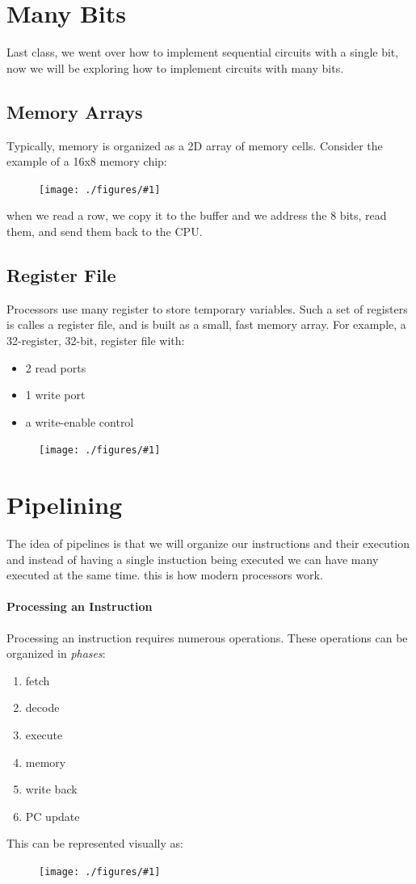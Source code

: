 \documentclass[12pt]{book}
\title{\coursetitle\linebreak\lecturename}
\author{\\Cain Susko\\ 
           \\ \\ \\
      Queen's University 
    \\School of Computing\\}
\newcommand{\incimg}[2]{%
       \begin{figure}[h]
               \centering
               \texttt{[image: ./figures/\#1]}
       \end{figure}
}
\begin{document}
\begin{titlepage}
        \maketitle
\end{titlepage}


\section*{Many Bits}
Last class, we went over how to implement sequential circuits with a single bit,
now we will be exploring how to implement circuits with many bits.

\subsection*{Memory Arrays}
Typically, memory is organized as a 2D array of memory cells. 
Consider the example of a 16x8 memory chip:
\incimg{memArr}{0.5}

when we read a row, we copy it to the buffer and we address the 8 bits, read them, and send them 
back to the CPU.

\subsection*{Register File}
Processors use many register to store temporary variables. Such a set of registers is calles a 
register file, and is built as a small, fast memory array. For example, a 32-register, 32-bit, 
register file with:
\begin{itemize}
        \item 2 read ports
        \item 1 write port
        \item a write-enable control
\end{itemize}
\incimg{regFile}{0.5}

\section*{Pipelining}
The idea of pipelines is that we will organize our instructions and their execution and instead 
of having a single instuction being executed we can have many executed at the same time. this is
how modern processors work.

\paragraph{Processing an Instruction}
Processing an instruction requires numerous operations. These operations can be organized in 
\textit{phases}:
\begin{enumerate}
        \item fetch
        \item decode
        \item execute
        \item memory
        \item write back
        \item PC update
\end{enumerate}
 This can be represented visually as:
 \incimg{process}{0.7}
\end{document}
